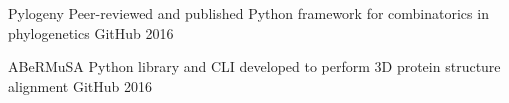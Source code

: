 
\begin{cvhonors}

  \cvhonor
    {Pylogeny} %
    {Peer-reviewed and published Python framework for combinatorics in phylogenetics} %
    {GitHub} %
    {2016} %

  \cvhonor
    {ABeRMuSA} %
    {Python library and CLI developed to perform 3D protein structure alignment} %
    {GitHub} %
    {2016} %

\end{cvhonors}
